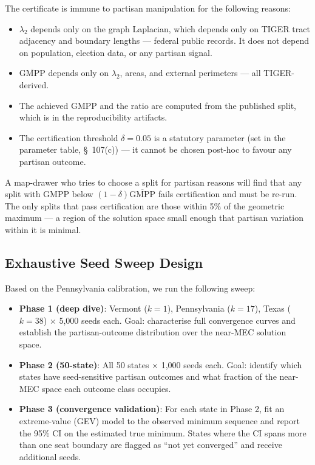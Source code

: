 The certificate is immune to partisan manipulation for the following reasons:
\begin{itemize}
  \item $\lambda_2$ depends only on the graph Laplacian, which depends only
        on TIGER tract adjacency and boundary lengths --- federal public records.
        It does not depend on population, election data, or any partisan signal.
  \item $\overline{\mathrm{GMPP}}$ depends only on $\lambda_2$, areas, and
        external perimeters --- all TIGER-derived.
  \item The achieved GMPP and the ratio are computed from the published split,
        which is in the reproducibility artifacts.
  \item The certification threshold $\delta = 0.05$ is a statutory parameter
        (set in the parameter table, \S~107(c)) --- it cannot be chosen post-hoc
        to favour any partisan outcome.
\end{itemize}

A map-drawer who tries to choose a split for partisan reasons will find that
any split with GMPP below $(1-\delta)\overline{\mathrm{GMPP}}$ fails
certification and must be re-run. The only splits that pass certification are
those within 5\% of the geometric maximum --- a region of the solution space
small enough that partisan variation within it is minimal.

\subsection{Exhaustive Seed Sweep Design}
\label{sec:methodology:sweep}

Based on the Pennsylvania calibration, we run the following sweep:

\begin{itemize}
  \item \textbf{Phase 1 (deep dive)}: Vermont ($k=1$), Pennsylvania ($k=17$),
        Texas ($k=38$) $\times$ 5{,}000 seeds each. Goal: characterise full
        convergence curves and establish the partisan-outcome distribution over
        the near-MEC solution space.
  \item \textbf{Phase 2 (50-state)}: All 50 states $\times$ 1{,}000 seeds
        each. Goal: identify which states have seed-sensitive partisan outcomes
        and what fraction of the near-MEC space each outcome class occupies.
  \item \textbf{Phase 3 (convergence validation)}: For each state in Phase 2,
        fit an extreme-value (GEV) model to the observed minimum sequence and
        report the 95\% CI on the estimated true minimum. States where the CI
        spans more than one seat boundary are flagged as ``not yet converged''
        and receive additional seeds.
\end{itemize}

